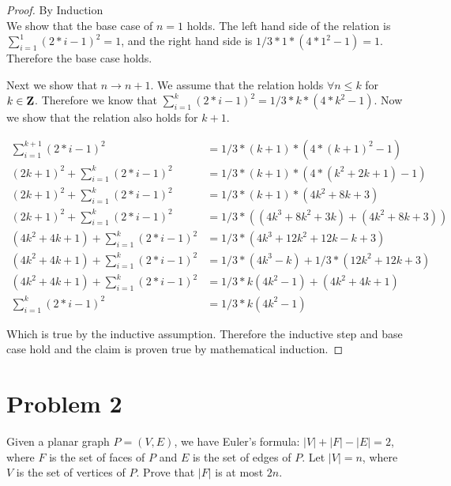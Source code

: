 \documentclass[11pt]{article}
\begin{document}
\begin{proof}
By Induction\\

We show that the base case of $n = 1$ holds. The left hand side of the relation is $\sum_{i=1}^1(2 * i - 1) ^2 = 1$, and the right hand side is $1/3 * 1 * (4 * 1^2 - 1) = 1$. Therefore the base case holds. 

Next we show that $n \rightarrow n + 1$. We assume that the relation holds $\forall n \leq k$ for $k \in \mathbf{Z}$. Therefore we know that $\sum_{i=1}^k  (2 * i - 1) ^2 = 1/3 * k * (4 * k^2 - 1)$. Now we show that the relation also holds for $k + 1$. 

\begin{equation*}
\begin{split}
\sum_{i=1}^{k+1}  (2 * i - 1) ^2 & = 1/3 * (k + 1) * (4 * (k+1)^2 - 1)\\
(2k + 1)^2 + \sum_{i=1}^{k}  (2 * i - 1) ^2 & = 1/3 * (k + 1) * (4 * (k^2 + 2k + 1) - 1)\\
(2k + 1)^2 + \sum_{i=1}^{k}  (2 * i - 1) ^2 & = 1/3 * (k + 1) * (4k^2 + 8k + 3)\\
(2k + 1)^2 + \sum_{i=1}^{k}  (2 * i - 1) ^2 & = 1/3 * ((4k^3 + 8k^2 + 3k) + (4k^2 + 8k + 3))\\
(4k^2 + 4k + 1) + \sum_{i=1}^{k}  (2 * i - 1) ^2 & = 1/3 * (4k^3 + 12k^2 + 12k - k + 3)\\
(4k^2 + 4k + 1) + \sum_{i=1}^{k}  (2 * i - 1) ^2 & = 1/3 * (4k^3 - k) + 1/3 * (12k^2 + 12k + 3)\\
(4k^2 + 4k + 1) + \sum_{i=1}^{k}  (2 * i - 1) ^2 & = 1/3 * k(4k^2 - 1) + (4k^2 + 4k + 1)\\
\sum_{i=1}^{k}  (2 * i - 1) ^2 & = 1/3 * k(4k^2 - 1)
\end{split}
\end{equation*}

Which is true by the inductive assumption. Therefore the inductive step and base case hold and the claim is proven true by mathematical induction.

\end{proof}

\newpage
\section*{Problem 2}

Given a planar graph $P=(V,E)$, we have Euler's formula:
$|V|+|F|-|E|=2$, where $F$ is the set of faces of $P$ and $E$ is the
set of edges of $P$.
Let $|V|=n$, where $V$ is the set of vertices of $P$.
Prove that $|F|$ is at most $2n$.
\newline
\end{document}
